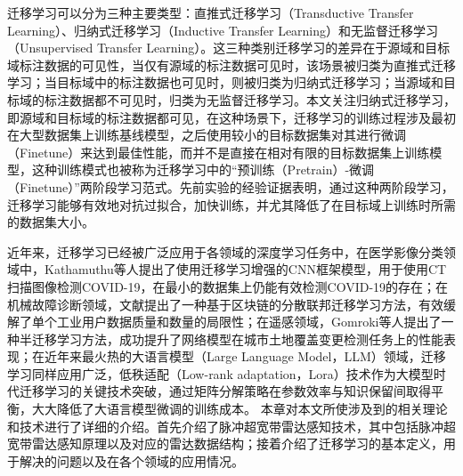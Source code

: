 迁移学习可以分为三种主要类型\cite{zhuang2020comprehensive}：直推式迁移学习（Transductive Transfer Learning）、归纳式迁移学习（Inductive Transfer Learning）和无监督迁移学习（Unsupervised Transfer Learning）。这三种类别迁移学习的差异在于源域和目标域标注数据的可见性，当仅有源域的标注数据可见时，该场景被归类为直推式迁移学习；当目标域中的标注数据也可见时，则被归类为归纳式迁移学习；当源域和目标域的标注数据都不可见时，归类为无监督迁移学习。本文关注归纳式迁移学习，即源域和目标域的标注数据都可见，在这种场景下，迁移学习的训练过程涉及最初在大型数据集上训练基线模型，之后使用较小的目标数据集对其进行微调（Finetune）来达到最佳性能，而并不是直接在相对有限的目标数据集上训练模型，这种训练模式也被称为迁移学习中的“预训练（Pretrain）-微调 （Finetune）”两阶段学习范式。先前实验的经验证据表明，通过这种两阶段学习，迁移学习能够有效地对抗过拟合，加快训练，并尤其降低了在目标域上训练时所需的数据集大小\cite{hendrycks2019using}。

近年来，迁移学习已经被广泛应用于各领域的深度学习任务中，在医学影像分类领域中，Kathamuthu等人\cite{kathamuthu2023deep}提出了使用迁移学习增强的CNN框架模型，用于使用CT扫描图像检测COVID-19，在最小的数据集上仍能有效检测COVID-19的存在；在机械故障诊断领域，文献\parencite{zhang2023blockchain}提出了一种基于区块链的分散联邦迁移学习方法，有效缓解了单个工业用户数据质量和数量的局限性；在遥感领域，Gomroki等人\cite{gomroki2023stcd}提出了一种半迁移学习方法，成功提升了网络模型在城市土地覆盖变更检测任务上的性能表现；在近年来最火热的大语言模型（Large Language Model，LLM）领域，迁移学习同样应用广泛，低秩适配（Low-rank adaptation，Lora）\cite{hu2022lora}技术作为大模型时代迁移学习的关键技术突破，通过矩阵分解策略在参数效率与知识保留间取得平衡，大大降低了大语言模型微调的训练成本。
本章对本文所使涉及到的相关理论和技术进行了详细的介绍。首先介绍了脉冲超宽带雷达感知技术，其中包括脉冲超宽带雷达感知原理以及对应的雷达数据结构；接着介绍了迁移学习的基本定义，用于解决的问题以及在各个领域的应用情况。
